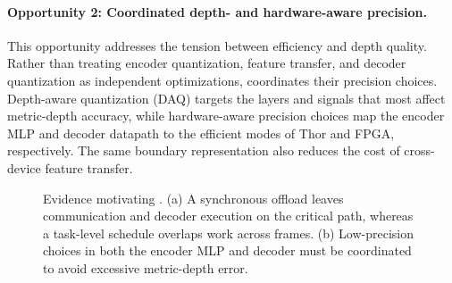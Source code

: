 \paragraph{Opportunity 2: Coordinated depth- and hardware-aware precision.}
This opportunity addresses the tension between efficiency and depth quality.
Rather than treating encoder quantization, feature transfer, and decoder
quantization as independent optimizations, \system{} coordinates their
precision choices.  Depth-aware quantization (DAQ) targets the layers and
signals that most affect metric-depth accuracy, while hardware-aware precision
choices map the encoder MLP and decoder datapath to the efficient modes of
Thor and FPGA, respectively.  The same boundary representation also reduces
the cost of cross-device feature transfer.

\begin{figure}[t]
  \centering
  \caption{Evidence motivating \system. (a) A synchronous offload leaves
  communication and decoder execution on the critical path, whereas a
  task-level schedule overlaps work across frames. (b) Low-precision choices
  in both the encoder MLP and decoder must be coordinated to avoid excessive
  metric-depth error.}
  \label{fig:motivation}
\end{figure}
